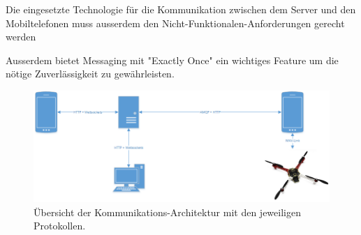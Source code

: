 Die eingesetzte Technologie für die Kommunikation zwischen dem Server und den Mobiltelefonen muss ausserdem den Nicht-Funktionalen-Anforderungen gerecht werden

Ausserdem bietet Messaging mit "Exactly Once" ein wichtiges Feature um die nötige Zuverlässigkeit zu gewährleisten. 


\begin{figure}[h]
	\includegraphics[width=1.0\textwidth]{images/Communication-Overview-Diagram.png}
	\caption{Übersicht der Kommunikations-Architektur mit den jeweiligen Protokollen. }
	\label{fig:communication-architecture-overview}
\end{figure}